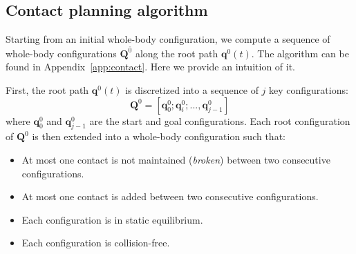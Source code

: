 \subsection{Contact planning algorithm}
Starting from an initial whole-body configuration, we compute a sequence
of whole-body configurations  $\mathbf{Q}^{\overline{0}}$ along the root path $\mathbf{q}^0(t)$.
The algorithm can be found in Appendix~\ref{app:contact}. Here we provide an intuition of it.

First, the root path $\mathbf{q}^0(t)$ is discretized into a sequence of $j$ key configurations:  
\begin{equation*}
	\mathbf{Q}^0 = [\mathbf{q}^0_{0}; \mathbf{q}^0_{i}; ..., \mathbf{q}^0_{j-1}]
\end{equation*} 
where $\mathbf{q}^0_{0}$ and $\mathbf{q}^0_{j-1}$ are the start and goal configurations. %
Each root configuration of $\mathbf{Q}^0$ is then extended into a whole-body configuration such that:
\begin{itemize} 
\item At most one contact is not maintained (\textit{broken}) between two consecutive configurations.
\item At most one contact is added between two consecutive configurations.
\item Each configuration is in static equilibrium.
\item Each configuration is collision-free.
\end{itemize} 




